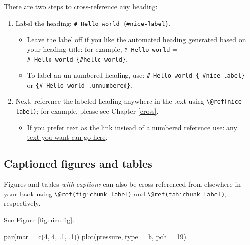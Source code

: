 \documentclass[
]{article}
\newenvironment{Shaded}{\begin{snugshade}}{\end{snugshade}}
\newcommand{\AttributeTok}[1]{\textcolor[rgb]{0.77,0.63,0.00}{#1}}
\newcommand{\DecValTok}[1]{\textcolor[rgb]{0.00,0.00,0.81}{#1}}
\newcommand{\FunctionTok}[1]{\textcolor[rgb]{0.00,0.00,0.00}{#1}}
\newcommand{\NormalTok}[1]{#1}
\newcommand{\StringTok}[1]{\textcolor[rgb]{0.31,0.60,0.02}{#1}}
\providecommand{\tightlist}{%
  \setlength{\itemsep}{0pt}\setlength{\parskip}{0pt}}
\begin{document}
There are two steps to cross-reference any heading:

\begin{enumerate}
\def\labelenumi{\arabic{enumi}.}
\tightlist
\item
  Label the heading: \texttt{\#\ Hello\ world\ \{\#nice-label\}}.

  \begin{itemize}
  \tightlist
  \item
    Leave the label off if you like the automated heading generated based on your heading title: for example, \texttt{\#\ Hello\ world} = \texttt{\#\ Hello\ world\ \{\#hello-world\}}.
  \item
    To label an un-numbered heading, use: \texttt{\#\ Hello\ world\ \{-\#nice-label\}} or \texttt{\{\#\ Hello\ world\ .unnumbered\}}.
  \end{itemize}
\item
  Next, reference the labeled heading anywhere in the text using \texttt{\textbackslash{}@ref(nice-label)}; for example, please see Chapter \ref{cross}.

  \begin{itemize}
  \tightlist
  \item
    If you prefer text as the link instead of a numbered reference use: \protect\hyperlink{cross}{any text you want can go here}.
  \end{itemize}
\end{enumerate}

\hypertarget{captioned-figures-and-tables}{%
\subsection{Captioned figures and tables}\label{captioned-figures-and-tables}}

Figures and tables \emph{with captions} can also be cross-referenced from elsewhere in your book using \texttt{\textbackslash{}@ref(fig:chunk-label)} and \texttt{\textbackslash{}@ref(tab:chunk-label)}, respectively.

See Figure \ref{fig:nice-fig}.

\begin{Shaded}
\begin{Highlighting}[]
\FunctionTok{par}\NormalTok{(}\AttributeTok{mar =} \FunctionTok{c}\NormalTok{(}\DecValTok{4}\NormalTok{, }\DecValTok{4}\NormalTok{, .}\DecValTok{1}\NormalTok{, .}\DecValTok{1}\NormalTok{))}
\FunctionTok{plot}\NormalTok{(pressure, }\AttributeTok{type =} \StringTok{\textquotesingle{}b\textquotesingle{}}\NormalTok{, }\AttributeTok{pch =} \DecValTok{19}\NormalTok{)}
\end{Highlighting}
\end{Shaded}
\end{document}
